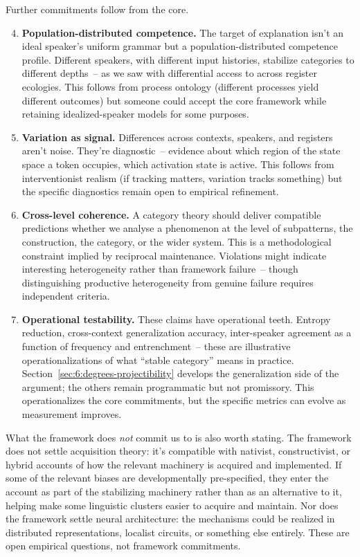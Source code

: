 Further commitments follow from the core.

\begin{enumerate}\setcounter{enumi}{3}
\item \textbf{Population-distributed competence.} The target of explanation isn't an ideal speaker's uniform grammar but a population-distributed competence profile. Different speakers, with different input histories, stabilize categories to different depths~-- as we saw with differential access to  across register ecologies. This follows from process ontology (different processes yield different outcomes) but someone could accept the core framework while retaining idealized-speaker models for some purposes.

\item \textbf{Variation as signal.} Differences across contexts, speakers, and registers aren't noise. They're diagnostic~-- evidence about which region of the state space a token occupies, which activation state is active. This follows from interventionist realism (if tracking matters, variation tracks something) but the specific diagnostics remain open to empirical refinement.

\item \textbf{Cross-level coherence.} A category theory should deliver compatible predictions whether we analyse a phenomenon at the level of subpatterns, the construction, the category, or the wider system. This is a methodological constraint implied by reciprocal maintenance. Violations might indicate interesting heterogeneity rather than framework failure~-- though distinguishing productive heterogeneity from genuine failure requires independent criteria.

\item \textbf{Operational testability.} These claims have operational teeth. Entropy reduction, cross-context generalization accuracy, inter-speaker agreement as a function of frequency and entrenchment~-- these are illustrative operationalizations of what \enquote{stable category} means in practice. Section~\ref{sec:6:degrees-projectibility} develops the generalization side of the argument; the others remain programmatic but not promissory. This operationalizes the core commitments, but the specific metrics can evolve as measurement improves.
\end{enumerate}

What the framework does \emph{not} commit us to is also worth stating. The framework does not settle acquisition theory: it's compatible with nativist, constructivist, or hybrid accounts of how the relevant machinery is acquired and implemented. If some of the relevant biases are developmentally pre-specified, they enter the account as part of the stabilizing machinery rather than as an alternative to it, helping make some linguistic clusters easier to acquire and maintain. Nor does the framework settle neural architecture: the mechanisms could be realized in distributed representations, localist circuits, or something else entirely. These are open empirical questions, not framework commitments.

